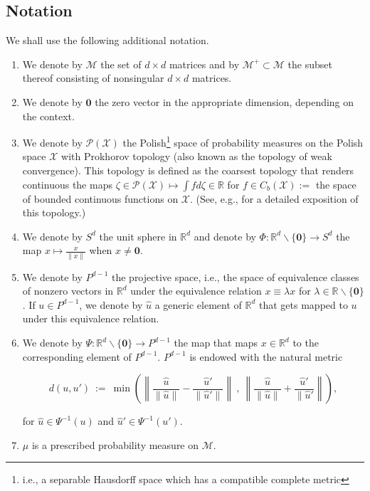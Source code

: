 \documentclass[10pt,a4paper]{amsart}
\newcommand{\R}{\mathbb{R}}
\newcommand{\M}{\mathcal{M}}
\newcommand{\PA}{\mathcal{P}}
\newcommand{\X}{\mathcal{X}}
\newcommand{\0}{\textbf{0}}
\begin{document}
 \subsection{Notation}

 
 We shall use the following additional notation.\\
 
 \begin{enumerate}

\item We denote by $\M$ the set of $d\times d$ matrices and by $\M^+ \subset \M$ the subset thereof consisting of nonsingular $d\times d$ matrices. \\

\item We denote by $\0$ the zero vector in the appropriate dimension, depending on the context.\\

\item We denote by $\PA(\X)$ the Polish\footnote{i.e., a separable Hausdorff space which has a compatible complete metric} space of probability measures on the Polish space $\X$ with Prokhorov topology (also known as the topology of weak convergence). This topology is defined as the coarsest topology that renders continuous the maps $\zeta \in \PA(\X) \mapsto \int fd\zeta\in \R$ for $f \in C_b(\X) :=$ the space of bounded continuous functions on $\X$. (See, e.g., \cite{Bill} for a detailed exposition of this topology.)\\

\item We denote by $S^d$ the unit sphere in $\R^d$ and denote by $\Phi : \R^d\backslash\{\0\} \to S^d$ the map $x \mapsto \frac{x}{\|x\|}$ when $x \neq \0$.\\

\item We denote by $P^{d-1}$ the projective space, i.e., the space of  equivalence classes of nonzero vectors in $\R^d$ under the equivalence relation $x \equiv \lambda x$ for $\lambda \in \R\backslash\{\0\}$. If $u \in P^{d-1}$, we denote by $\hat{u}$ a generic element of $\R^d$ that gets mapped to $u$ under this equivalence relation. \\

\item We denote by $\Psi : \R^d\backslash\{\0\}  \to P^{d-1}$ the map that maps $x \in \R^d$ to the corresponding element of $P^{d-1}$. $P^{d-1}$ is endowed with the natural metric 

$$d(u,u') \ := \ \min\left(\left\|\frac{\hat{u}}{\|\hat{u}\|}-\frac{\hat{u}'}{\|\hat{u}'\|}\right\| \ , \ \left\|\frac{\hat{u}}{\|\hat{u}\|}+\frac{\hat{u}'}{\|\hat{u}'}\right\|\right),$$

\medskip

for $\hat{u}\in \Psi^{-1}(u)$ and $\hat{u}' \in \Psi^{-1}(u')$.\\

\item $\mu$ is a prescribed probability measure on $\M$.

\end{enumerate}
\end{document}
